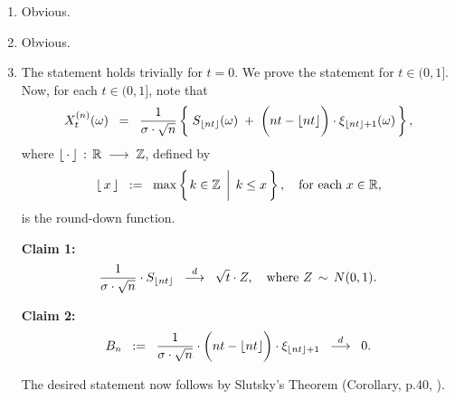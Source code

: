 \proof
\begin{enumerate}
\item	Obvious.
\item	Obvious.
\item	The statement holds trivially for $t = 0$.
		We prove the statement for $t \in (0,1]$.
		Now, for each $t \in (0,1]$, note that
		\begin{equation*}
		X^{(n)}_{t}(\omega)
		\;\; = \;\;
		\dfrac{1}{\sigma\cdot\sqrt{n}}
		\left\{\;
		S_{\lfloor nt \rfloor}(\omega) \;+\; \left(\overset{{\color{white}1}}{nt} - \lfloor nt \rfloor\right)\cdot\xi_{\lfloor nt \rfloor+1}(\omega)
		\,\right\},
		\end{equation*}
		where $\lfloor\,\cdot\,\rfloor\,:\,\mathbb{R}\;\longrightarrow\;\mathbb{Z}$, defined by
		\begin{equation*}
		\lfloor\,x\,\rfloor
		\;\;:=\;\;
		\max\left\{
		\left. k \in \overset{{\color{white}1}}{\Z} \,\;\right\vert\; k \leq x
		\,\right\},
		\quad
		\textnormal{for each $x \in \Re$},
		\end{equation*}
		is the round-down function.

		\vskip 0.5cm
		\begin{center}
		\begin{minipage}{6.0in}
		\noindent
		\textbf{Claim 1:}
		\begin{equation*}
		\dfrac{1}{\sigma\cdot\sqrt{n}}
		\cdot
		S_{\lfloor nt \rfloor}
		\;\; \overset{d}{\longrightarrow} \;\;
		\sqrt{t}\cdot Z,
		\quad
		\textnormal{where $Z\,\sim\,N(0,1)$}.
		\end{equation*}
		\end{minipage}
		\end{center}
		
		\vskip 0.5cm
		\begin{center}
		\begin{minipage}{6.0in}
		\noindent
		\textbf{Claim 2:}
		\begin{equation*}
		B_{n} \;\; := \;\;
		\dfrac{1}{\sigma\cdot\sqrt{n}}
		\cdot
		\left(\overset{{\color{white}1}}{nt} - \lfloor nt \rfloor\right)
		\cdot
		\xi_{\lfloor nt \rfloor + 1}
		\;\; \overset{d}{\longrightarrow} \;\;
		0.
		\end{equation*}
		\end{minipage}
		\end{center}
		The desired statement now follows by Slutsky's Theorem (Corollary, p.40, \cite{Ferguson1996}).
		

\end{enumerate}
